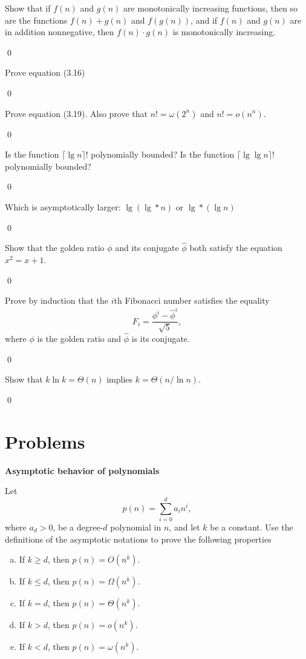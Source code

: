  Show that if $f(n)$ and $g(n)$ are monotonically increasing functions, then so are the functions $f(n) + g(n)$ and $f(g(n))$, and if $f(n)$ and $g(n)$ are in addition nonnegative, then $f(n) \cdot g(n)$ is monotonically increasing.

\sol \qed

 Prove equation (3.16)

\pf \qed

 Prove equation (3.19). Also prove that $n! = \omega(2^n)$ and $n! = o(n^n)$.

\pf \qed

 Is the function $\lceil \lg n \rceil !$ polynomially bounded? Is the function $\lceil \lg \lg n \rceil !$ polynomially bounded?

\sol \qed

 Which is asymptotically larger: $\lg(\lg * n)$ or $\lg * (\lg n)$

\sol \qed

 Show that the golden ratio $\phi$ and its conjugate $\hat{\phi}$ both satisfy the equation $x^2 = x + 1$.

\sol \qed

 Prove by induction that the $i$th Fibonacci number satisfies the equality $$F_i = \frac{\phi^i - \hat{\phi}^i}{\sqrt{5}},$$ where $\phi$ is the golden ratio and $\hat{\phi}$ is its conjugate.

\pf \qed

 Show that $k \ln k = \Theta(n)$ implies $k = \Theta(n / \ln n)$.

\sol \qed

\section{Problems}

 \textbf{Asymptotic behavior of polynomials}

Let $$p(n) = \sum_{i=0}^d a_i n^i,$$ where $a_d > 0$, be a degree-$d$ polynomial in $n$, and let $k$ be a constant. Use the definitions of the asymptotic notations to prove the following properties

\begin{enumerate}[(a)]
    \item If $k \geq d$, then $p(n) = O(n^k)$.
    \item If $k \leq d$, then $p(n) = \Omega(n^k)$.
    \item If $k = d$, then $p(n) = \Theta(n^k)$.
    \item If $k > d$, then $p(n) = o(n^k)$.
    \item If $k < d$, then $p(n) = \omega(n^k)$.
\end{enumerate}

